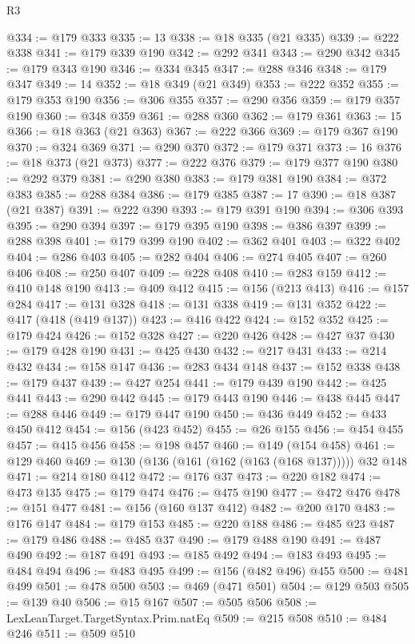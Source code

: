 \begin{lexlean}{R3}
\begin{coremodule}
@334 := @179 @333
@335 := 13
@338 := @18 @335 (@21 @335)
@339 := @222 @338
@341 := @179 @339 @190
@342 := @292 @341
@343 := @290 @342
@345 := @179 @343 @190
@346 := @334 @345
@347 := @288 @346
@348 := @179 @347
@349 := 14
@352 := @18 @349 (@21 @349)
@353 := @222 @352
@355 := @179 @353 @190
@356 := @306 @355
@357 := @290 @356
@359 := @179 @357 @190
@360 := @348 @359
@361 := @288 @360
@362 := @179 @361
@363 := 15
@366 := @18 @363 (@21 @363)
@367 := @222 @366
@369 := @179 @367 @190
@370 := @324 @369
@371 := @290 @370
@372 := @179 @371
@373 := 16
@376 := @18 @373 (@21 @373)
@377 := @222 @376
@379 := @179 @377 @190
@380 := @292 @379
@381 := @290 @380
@383 := @179 @381 @190
@384 := @372 @383
@385 := @288 @384
@386 := @179 @385
@387 := 17
@390 := @18 @387 (@21 @387)
@391 := @222 @390
@393 := @179 @391 @190
@394 := @306 @393
@395 := @290 @394
@397 := @179 @395 @190
@398 := @386 @397
@399 := @288 @398
@401 := @179 @399 @190
@402 := @362 @401
@403 := @322 @402
@404 := @286 @403
@405 := @282 @404
@406 := @274 @405
@407 := @260 @406
@408 := @250 @407
@409 := @228 @408
@410 := @283 @159
@412 := @410 @148 @190
@413 := @409 @412
@415 := @156 (@213 @413)
@416 := @157 @284
@417 := @131 @328
@418 := @131 @338
@419 := @131 @352
@422 := @417 (@418 (@419 @137))
@423 := @416 @422
@424 := @152 @352
@425 := @179 @424
@426 := @152 @328
@427 := @220 @426
@428 := @427 @37
@430 := @179 @428 @190
@431 := @425 @430
@432 := @217 @431
@433 := @214 @432
@434 := @158 @147
@436 := @283 @434 @148
@437 := @152 @338
@438 := @179 @437
@439 := @427 @254
@441 := @179 @439 @190
@442 := @425 @441
@443 := @290 @442
@445 := @179 @443 @190
@446 := @438 @445
@447 := @288 @446
@449 := @179 @447 @190
@450 := @436 @449
@452 := @433 @450 @412
@454 := @156 (@423 @452)
@455 := @26 @155
@456 := @454 @455
@457 := @415 @456
@458 := @198 @457
@460 := @149 (@154 @458)
@461 := @129 @460
@469 := @130 (@136 (@161 (@162 (@163 (@168 @137))))) @32 @148
@471 := @214 @180 @412
@472 := @176 @37
@473 := @220 @182
@474 := @473 @135
@475 := @179 @474
@476 := @475 @190
@477 := @472 @476
@478 := @151 @477
@481 := @156 (@160 @137 @412)
@482 := @200 @170
@483 := @176 @147
@484 := @179 @153
@485 := @220 @188
@486 := @485 @23
@487 := @179 @486
@488 := @485 @37
@490 := @179 @488 @190
@491 := @487 @490
@492 := @187 @491
@493 := @185 @492
@494 := @183 @493
@495 := @484 @494
@496 := @483 @495
@499 := @156 (@482 @496) @455
@500 := @481 @499
@501 := @478 @500
@503 := @469 (@471 @501)
@504 := @129 @503
@505 := @139 @40
@506 := @15 @167
@507 := @505 @506
@508 := LexLeanTarget.TargetSyntax.Prim.natEq
@509 := @215 @508
@510 := @484 @246
@511 := @509 @510

\end{coremodule}
\end{lexlean}
